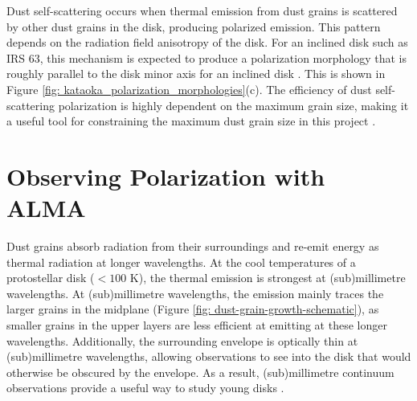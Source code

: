 

Dust self-scattering occurs when thermal emission from dust grains is scattered by other dust grains in the disk, producing polarized emission. This pattern depends on the radiation field anisotropy of the disk. For an inclined disk such as IRS 63, this mechanism is expected to produce a polarization morphology that is roughly parallel to the disk minor axis for an inclined disk \citep[e.g.][]{Kataoka_2015, Yang2016, Lin2021}. This is shown in Figure \ref{fig: kataoka_polarization_morphologies}(c).  The efficiency of dust self-scattering polarization is highly dependent on the maximum grain size, making it a useful tool for constraining the maximum dust grain size in this project \citep{Harrison2024}.

























\section{Observing Polarization with ALMA} 




Dust grains absorb radiation from their surroundings and re-emit energy as thermal radiation at longer wavelengths. At the cool temperatures of a protostellar disk ($<100$ K), the thermal emission is strongest at (sub)millimetre wavelengths. At (sub)millimetre wavelengths, the emission mainly traces the larger grains in the midplane (Figure \ref{fig: dust-grain-growth-schematic}), as smaller grains in the upper layers are less efficient at emitting at these longer wavelengths. Additionally, the surrounding envelope is optically thin at (sub)millimetre wavelengths, allowing observations to see into the disk that would otherwise be obscured by the envelope. As a result, (sub)millimetre continuum observations provide a useful way to study young disks \citep{Andrews}.


